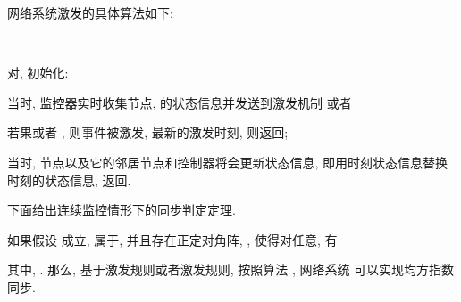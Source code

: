             网络系统激发的具体算法如下:
            \begin{algo}[连续监控事件激发算法]\label{algo1}~~

             对, 初始化:

             当时, 监控器实时收集节点, 的状态信息并发送到激发机制 或者

             若果或者 , 则事件被激发, 最新的激发时刻, 则返回;

             当时, 节点以及它的邻居节点和控制器将会更新状态信息, 即用时刻状态信息替换时刻的状态信息, 返回.
             \end{algo}

        下面给出连续监控情形下的同步判定定理.
        \begin{thm}\label{themcon}
            如果假设  成立, 属于, 并且存在正定对角阵, , 使得对任意, 有
            \begin{comment}\label{thm:1}
            \bar{\delta}P(u)\otimes G-c\theta\underline{\alpha} P(u)L(u)\otimes G\Gamma
            -c\tau\underline{\alpha} P(u)D(u)\otimes G\Gamma+\frac{1}{2}\sum_{v=1}^{m}q_{uv}P(v)\otimes G\leq 0,
            \end{comment}
            其中, .
            那么, 基于激发规则或者激发规则, 按照算法 , 网络系统  可以实现均方指数同步.
        \end{thm}
